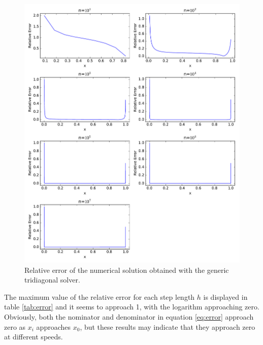 \documentclass{article}
\begin{document}
\begin{figure}[H]
    \includegraphics[width=\linewidth]{fig/rel_error.pdf}
    \caption{Relative error of the numerical solution obtained with the generic tridiagonal solver.}
    \label{fig:error}
\end{figure}

The maximum value of the relative error for each step length $h$ is displayed in table \ref{tab:error} and it seems to approach 1, with the logarithm approaching zero. Obviously, both the nominator and denominator in equation \ref{eq:error} approach zero as ${x_i}$ approaches ${x_0}$, but these results may indicate that they approach zero at different speeds.
\end{document}
